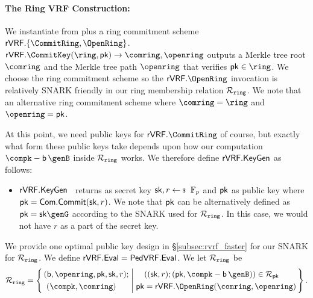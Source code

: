 \paragraph{The Ring VRF Construction:}
We instantiate \rVRF from \PedVRF plus a ring commitment scheme
 $\rVRF.\{ \CommitRing, \OpenRing \}$. $ \rVRF.\CommitKey(\ring,\pk) \rightarrow \comring,\openring$  outputs a Merkle tree root $\comring  $ and the Merkle tree path $ \openring $ that verifies $ \pk \in \ring $.
We choose the ring commitment scheme so the $\rVRF.\OpenRing$ invocation
is relatively SNARK friendly in our ring membership relation $ \mathcal{R}_{\mathtt{ring}} $. We note that an alternative ring commitment scheme where $ \comring = \ring $ and $ \openring = \pk $.

At this point, we need public keys for $\rVRF.\CommitRing$ of course,
but exactly what form these public keys take depends upon how our computation
 $\compk - \openpk \, \genB$ inside $\mathcal{R}_{\mathtt{ring}}$ works.
We therefore define $ {\mathsf{rVRF}}.{\mathsf{KeyGen}} $ as follows:

\begin{itemize}
	\item ${\mathsf{rVRF}}.{\mathsf{KeyGen}}$ \, returns as secret key $\sk,r \leftsample \F_p$ and $ \mathsf{pk} $ as public key where $ \mathsf{pk} = \mathsf{Com}.\mathsf{Commit}(\mathsf{sk},r)  $. We note that $ \mathsf{pk}  $ can be alternatively defined as $ \pk = \sk \genG $ according to the SNARK used for $ \mathcal{R}_{\mathtt{ring}} $. In this case, we would not have $ r $ as a part of the secret key.
\end{itemize}

 
We provide one optimal public key design in \S\ref{subsec:rvrf_faster} for our SNARK  for $ \mathcal{R}_{\mathtt{ring}} $. 
\vspace{-3mm}
We define ${\mathsf{rVRF}}.{\mathsf{Eval}} = {\mathsf{PedVRF}}.{\mathsf{Eval}}$.
We let  $ \mathcal{R}_{\mathtt{ring}} $ be
$$ \Rring = \Setst{ 
	\begin{aligned}
		& (\openpk, \openring, \pk, \sk, r); \\ 
		& \,\, (\compk,\comring) 
	\end{aligned}
}{
	\begin{aligned}
		 &((\sk, r);(\pk, \compk - \openpk \, \genB)) \in \rel_{\pk} \\
		\pk &= \rVRF.\OpenRing(\comring,\openring)
	\end{aligned}
} \mathperiod $$


